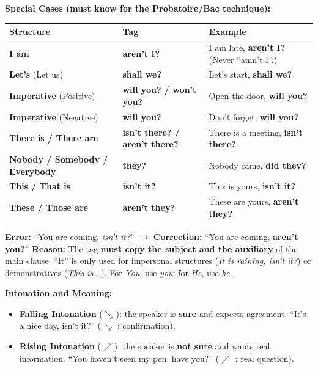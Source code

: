 \documentclass[11pt]{article}
\begin{document}
\textbf{Special Cases (must know for the Probatoire/Bac technique):}
\begin{aretenir}
\begin{center}
\begin{tabularx}{\linewidth}{|l|l|X|}\hline
\rowcolor{popgreenL}\textbf{Structure} & \textbf{Tag} & \textbf{Example} \\ \hline
\textbf{I am} & \textbf{aren't I?} & I am late, \textbf{aren't I?} (Never ``amn't I''.) \\ \hline
\textbf{Let's} (Let us) & \textbf{shall we?} & Let's start, \textbf{shall we?} \\ \hline
\textbf{Imperative} (Positive) & \textbf{will you? / won't you?} & Open the door, \textbf{will you?} \\ \hline
\textbf{Imperative} (Negative) & \textbf{will you?} & Don't forget, \textbf{will you?} \\ \hline
\textbf{There is / There are} & \textbf{isn't there? / aren't there?} & There is a meeting, \textbf{isn't there?} \\ \hline
\textbf{Nobody / Somebody / Everybody} & \textbf{they?} & Nobody came, \textbf{did they?} \\ \hline
\textbf{This / That is} & \textbf{isn't it?} & This is yours, \textbf{isn't it?} \\ \hline
\textbf{These / Those are} & \textbf{aren't they?} & These are yours, \textbf{aren't they?} \\ \hline
\end{tabularx}
\end{center}
\end{aretenir}

\begin{attention}
\textbf{Error:} ``You are coming, \emph{isn't it?}'' \quad $\rightarrow$ \textbf{Correction:} ``You are coming, \textbf{aren't you?}''
\textbf{Reason:} The tag \textbf{must copy the subject and the auxiliary} of the main clause. ``It'' is only used for impersonal structures (\emph{It is raining, isn't it?}) or demonstratives (\emph{This is...}). For \emph{You}, use \emph{you}; for \emph{He}, use \emph{he}.
\end{attention}

\textbf{Intonation and Meaning:}
\begin{itemize}
    \item \textbf{Falling Intonation} ($\searrow$): the speaker is \textbf{sure} and expects agreement. ``It's a nice day, isn't it?'' ($\searrow$ : confirmation).
    \item \textbf{Rising Intonation} ($\nearrow$): the speaker is \textbf{not sure} and wants real information. ``You haven't seen my pen, have you?'' ($\nearrow$ : real question).
\end{itemize}
\end{document}
